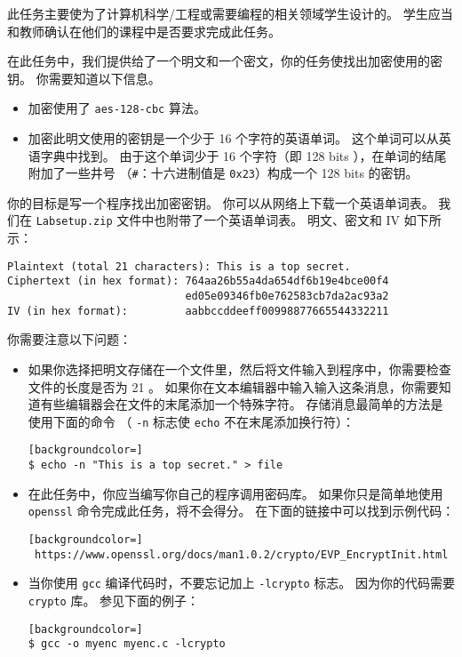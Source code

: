 此任务主要使为了计算机科学/工程或需要编程的相关领域学生设计的。
学生应当和教师确认在他们的课程中是否要求完成此任务。


在此任务中，我们提供给了一个明文和一个密文，你的任务使找出加密使用的密钥。
你需要知道以下信息。

\begin{itemize}
\item 加密使用了 {\tt aes-128-cbc} 算法。
\item 加密此明文使用的密钥是一个少于 16 个字符的英语单词。
      这个单词可以从英语字典中找到。
      由于这个单词少于 16 个字符（即 128 bits ），在单词的结尾附加了一些井号
      （\texttt{\#}：十六进制值是 \texttt{0x23}）构成一个 128 bits 的密钥。
\end{itemize}


你的目标是写一个程序找出加密密钥。
你可以从网络上下载一个英语单词表。
我们在 \texttt{Labsetup.zip} 文件中也附带了一个英语单词表。
明文、密文和 IV 如下所示：


\begin{lstlisting}
Plaintext (total 21 characters): This is a top secret.
Ciphertext (in hex format): 764aa26b55a4da654df6b19e4bce00f4
                            ed05e09346fb0e762583cb7da2ac93a2
IV (in hex format):         aabbccddeeff00998877665544332211
\end{lstlisting}



你需要注意以下问题：

\begin{itemize}
\item 如果你选择把明文存储在一个文件里，然后将文件输入到程序中，你需要检查文件的长度是否为 21 。
如果你在文本编辑器中输入输入这条消息，你需要知道有些编辑器会在文件的末尾添加一个特殊字符。
存储消息最简单的方法是使用下面的命令
（ \texttt{-n} 标志使 \texttt{echo} 不在末尾添加换行符）：


\begin{lstlisting}[backgroundcolor=]
$ echo -n "This is a top secret." > file
\end{lstlisting}

\item 在此任务中，你应当编写你自己的程序调用密码库。
如果你只是简单地使用 {\tt openssl} 命令完成此任务，将不会得分。
在下面的链接中可以找到示例代码：
\begin{lstlisting}[backgroundcolor=]
 https://www.openssl.org/docs/man1.0.2/crypto/EVP_EncryptInit.html
\end{lstlisting}


\item 当你使用 \texttt{gcc} 编译代码时，不要忘记加上 \texttt{-lcrypto} 标志。
因为你的代码需要 \texttt{crypto} 库。
参见下面的例子：

\begin{lstlisting}[backgroundcolor=]
$ gcc -o myenc myenc.c -lcrypto
\end{lstlisting}

\end{itemize}


